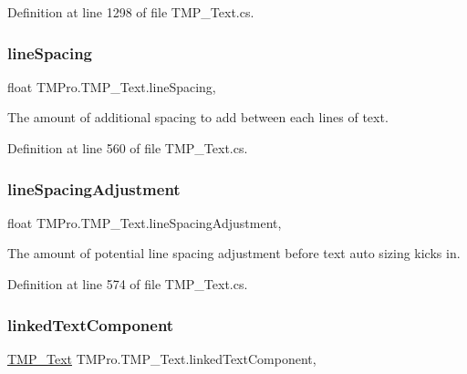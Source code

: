 Definition at line 1298 of file T\+M\+P\+\_\+\+Text.\+cs.

\mbox{\label{class_t_m_pro_1_1_t_m_p___text_a2b02e5ecbb2af2f3a2d3d76f5a23c13f}} 
\subsubsection{\texorpdfstring{lineSpacing}{lineSpacing}}
{\footnotesize\ttfamily float T\+M\+Pro.\+T\+M\+P\+\_\+\+Text.\+line\+Spacing\hspace{0.3cm}{\ttfamily [get]}, {\ttfamily [set]}}



The amount of additional spacing to add between each lines of text. 



Definition at line 560 of file T\+M\+P\+\_\+\+Text.\+cs.

\mbox{\label{class_t_m_pro_1_1_t_m_p___text_a966cc43dea3bed456624f8d85c29e70b}} 
\subsubsection{\texorpdfstring{lineSpacingAdjustment}{lineSpacingAdjustment}}
{\footnotesize\ttfamily float T\+M\+Pro.\+T\+M\+P\+\_\+\+Text.\+line\+Spacing\+Adjustment\hspace{0.3cm}{\ttfamily [get]}, {\ttfamily [set]}}



The amount of potential line spacing adjustment before text auto sizing kicks in. 



Definition at line 574 of file T\+M\+P\+\_\+\+Text.\+cs.

\mbox{\label{class_t_m_pro_1_1_t_m_p___text_acc715707a9f18f41f87ef2944b9ea6fa}} 
\subsubsection{\texorpdfstring{linkedTextComponent}{linkedTextComponent}}
{\footnotesize\ttfamily \mbox{\hyperlink{class_t_m_pro_1_1_t_m_p___text}{T\+M\+P\+\_\+\+Text}} T\+M\+Pro.\+T\+M\+P\+\_\+\+Text.\+linked\+Text\+Component\hspace{0.3cm}{\ttfamily [get]}, {\ttfamily [set]}}



